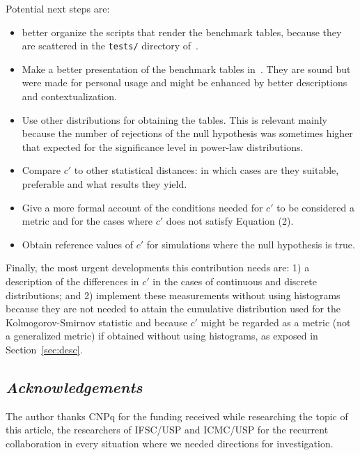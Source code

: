 \documentclass[12pt,fleqn]{article}
\begin{document}
Potential next steps are:
\begin{itemize}
	\item better organize the scripts that render the benchmark tables,
		because they are scattered in the \texttt{tests/} directory
		of~\cite{gmaneLegacy}.
	\item Make a better presentation of the benchmark tables in~\cite{ksstats}.
		They are sound but were made for personal usage and might be enhanced
		by better descriptions and contextualization.
	\item Use other distributions for obtaining the tables.
		This is relevant mainly because the number of rejections of the null hypothesis
		was sometimes higher that expected for the significance level in power-law distributions.
	\item Compare $c'$ to other statistical distances: in which cases are they suitable, preferable and
		what results they yield.
	\item Give a more formal account of the conditions needed for $c'$ to be considered a metric 
		and for the cases where $c'$ does not satisfy Equation (2).
	\item Obtain reference values of $c'$ for simulations where the null hypothesis is true.
\end{itemize}
\noindent Finally, the most urgent developments this contribution needs are:
1) a description of the differences in $c'$ in the cases of continuous and discrete distributions;
and 2) implement these measurements without using histograms because they are not needed to
attain the cumulative distribution used for the Kolmogorov-Smirnov statistic and because
$c'$ might be regarded as a metric (not a generalized metric) if obtained without using histograms,
as exposed in Section~\ref{sec:desc}.

\subsection*{\textit{Acknowledgements}}
The author thanks CNPq for the funding received while researching the topic of this article,
the researchers of IFSC/USP and ICMC/USP for the recurrent collaboration in every situation
where we needed directions for investigation.
\end{document}
